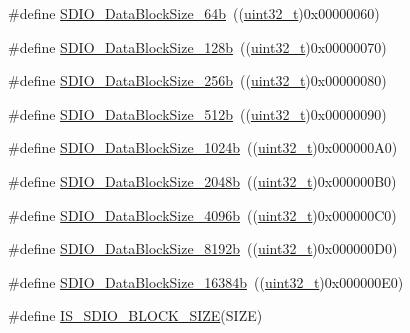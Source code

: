 \begin{DoxyCompactItemize}
\item 
\#define \hyperlink{group___s_d_i_o___data___block___size_ga981c219228ae8df11a501e15843338d4}{S\+D\+I\+O\+\_\+\+Data\+Block\+Size\+\_\+64b}~((\hyperlink{_p_e___types_8h_a33594304e786b158f3fb30289278f5af}{uint32\+\_\+t})0x00000060)
\item 
\#define \hyperlink{group___s_d_i_o___data___block___size_gaba545c3a5e0f3296341d89a647cb9751}{S\+D\+I\+O\+\_\+\+Data\+Block\+Size\+\_\+128b}~((\hyperlink{_p_e___types_8h_a33594304e786b158f3fb30289278f5af}{uint32\+\_\+t})0x00000070)
\item 
\#define \hyperlink{group___s_d_i_o___data___block___size_gaa099d7706f98a4fa6eb88277dc6680cf}{S\+D\+I\+O\+\_\+\+Data\+Block\+Size\+\_\+256b}~((\hyperlink{_p_e___types_8h_a33594304e786b158f3fb30289278f5af}{uint32\+\_\+t})0x00000080)
\item 
\#define \hyperlink{group___s_d_i_o___data___block___size_gaa619848f7700962c5b7065f43e286e0b}{S\+D\+I\+O\+\_\+\+Data\+Block\+Size\+\_\+512b}~((\hyperlink{_p_e___types_8h_a33594304e786b158f3fb30289278f5af}{uint32\+\_\+t})0x00000090)
\item 
\#define \hyperlink{group___s_d_i_o___data___block___size_ga7dad3c1c33e63a00eb6301b0a1135baf}{S\+D\+I\+O\+\_\+\+Data\+Block\+Size\+\_\+1024b}~((\hyperlink{_p_e___types_8h_a33594304e786b158f3fb30289278f5af}{uint32\+\_\+t})0x000000\+A0)
\item 
\#define \hyperlink{group___s_d_i_o___data___block___size_ga41eb937621c7ffcf2688c6bc0ea31464}{S\+D\+I\+O\+\_\+\+Data\+Block\+Size\+\_\+2048b}~((\hyperlink{_p_e___types_8h_a33594304e786b158f3fb30289278f5af}{uint32\+\_\+t})0x000000\+B0)
\item 
\#define \hyperlink{group___s_d_i_o___data___block___size_ga360411488abdbaf9eee9b99fca793f79}{S\+D\+I\+O\+\_\+\+Data\+Block\+Size\+\_\+4096b}~((\hyperlink{_p_e___types_8h_a33594304e786b158f3fb30289278f5af}{uint32\+\_\+t})0x000000\+C0)
\item 
\#define \hyperlink{group___s_d_i_o___data___block___size_gaf61913f3eff52c0f728db9ffbdaca7d2}{S\+D\+I\+O\+\_\+\+Data\+Block\+Size\+\_\+8192b}~((\hyperlink{_p_e___types_8h_a33594304e786b158f3fb30289278f5af}{uint32\+\_\+t})0x000000\+D0)
\item 
\#define \hyperlink{group___s_d_i_o___data___block___size_gae80bc49dbed677f7087d523c31fe10ae}{S\+D\+I\+O\+\_\+\+Data\+Block\+Size\+\_\+16384b}~((\hyperlink{_p_e___types_8h_a33594304e786b158f3fb30289278f5af}{uint32\+\_\+t})0x000000\+E0)
\item 
\#define \hyperlink{group___s_d_i_o___data___block___size_ga25ce8d64134659c479d61aa681761948}{I\+S\+\_\+\+S\+D\+I\+O\+\_\+\+B\+L\+O\+C\+K\+\_\+\+S\+I\+ZE}(S\+I\+ZE)

\end{DoxyCompactItemize}
